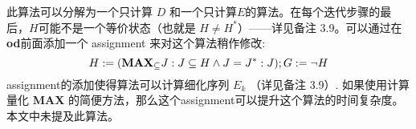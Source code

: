 此算法可以分解为一个只计算 $D$ 和一个只计算$E$的算法。在每个迭代步骤的最后，$H$可能不是一个等价状态（也就是 $ H \not= H^* $）——详见备注 3.9。可以通过在\textbf{od}前面添加一个 assignment 来对这个算法稍作修改:
$$ H := (\mbox{\textbf{MAX}}_{\subseteq } J : J \subseteq H \land J = J ^* : J); G := \neg H $$
assignment的添加使得算法可以计算细化序列 $E_k$ （详见备注 3.9）. 如果使用计算量化 \textbf{MAX} 的简便方法，那么这个assignment可以提升这个算法的时间复杂度。本文中未提及此算法。

